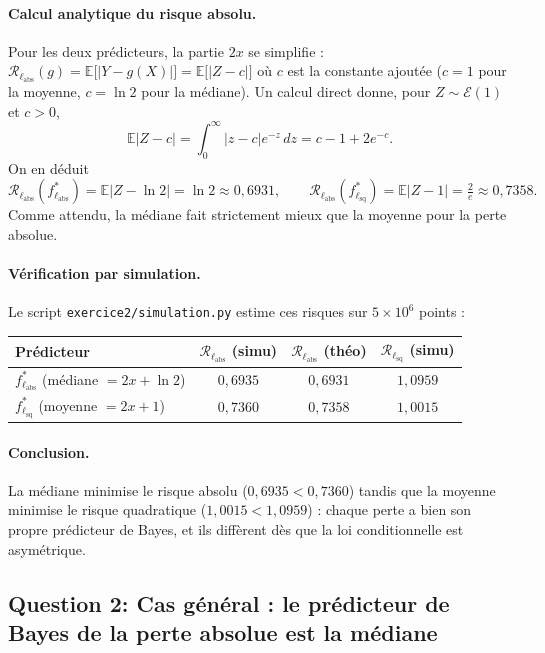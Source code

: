 \documentclass[11pt,a4paper]{article}
\newcommand{\E}{\mathbb{E}}
\newcommand{\fstar}{f^{*}}
\newcommand{\Risk}{\mathcal{R}}
\theoremstyle{plain}
\begin{document}
\paragraph{Calcul analytique du risque absolu.} Pour les deux prédicteurs, la
partie $2x$ se simplifie : $\Risk_{\ell_\text{abs}}(g)=\E\big[\lvert Y-g(X)\rvert\big]=\E\big[\lvert Z-c\rvert\big]$
où $c$ est la constante ajoutée ($c=1$ pour la moyenne, $c=\ln2$ pour la médiane).
Un calcul direct donne, pour $Z\sim\mathcal{E}(1)$ et $c>0$,
\[
    \E\lvert Z-c\rvert=\int_0^{\infty}\lvert z-c\rvert e^{-z}\,dz = c-1+2e^{-c}.
\]
On en déduit
\[
    \Risk_{\ell_\text{abs}}(\fstar_{\ell_\text{abs}})=\E\lvert Z-\ln2\rvert=\ln 2\approx 0{,}6931,
    \qquad
    \Risk_{\ell_\text{abs}}(\fstar_{\ell_\text{sq}})=\E\lvert Z-1\rvert=\tfrac{2}{e}\approx 0{,}7358 .
\]
Comme attendu, la médiane fait strictement mieux que la moyenne pour la perte
absolue.

\paragraph{Vérification par simulation.} Le script
\texttt{exercice2/simulation.py} estime ces risques sur $5\times10^{6}$ points :

\begin{center}
\begin{tabular}{lccc}
\toprule
Prédicteur & $\Risk_{\ell_\text{abs}}$ (simu) & $\Risk_{\ell_\text{abs}}$ (théo) & $\Risk_{\ell_\text{sq}}$ (simu)\\
\midrule
$\fstar_{\ell_\text{abs}}$ (médiane $=2x+\ln2$) & $0{,}6935$ & $0{,}6931$ & $1{,}0959$\\
$\fstar_{\ell_\text{sq}}$ (moyenne $=2x+1$)     & $0{,}7360$ & $0{,}7358$ & $1{,}0015$\\
\bottomrule
\end{tabular}
\end{center}

\paragraph{Conclusion.} La médiane minimise le risque absolu
($0{,}6935<0{,}7360$) tandis que la moyenne minimise le risque quadratique
($1{,}0015<1{,}0959$) : chaque perte a bien son propre prédicteur de Bayes, et
ils diffèrent dès que la loi conditionnelle est asymétrique.

\subsection*{Question 2: Cas général : le prédicteur de Bayes de la perte absolue est la médiane}
\end{document}
